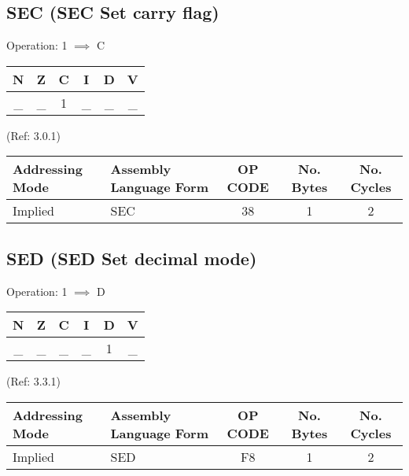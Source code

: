 \documentclass{article}
\begin{document}
  \subsection{SEC (SEC Set carry flag)}
  Operation:  1 $\implies$ C
  \begin{table}[H]
  \centering
  \begin{tabular}{|c c c c c c|}
  \hline
  N&Z&C&I&D&V\\
  \hline
  \_ & \_ & 1 & \_ & \_ & \_\\
  \hline
  \end{tabular}
  \end{table}
                                (Ref: 3.0.1)
  \begin{table}[H]
  \centering
  \begin{tabular}{|l|l|c|c|c|}
  \hline
    Addressing Mode& Assembly Language Form& OP CODE &No. Bytes&No. Cycles\\
  \hline
     Implied       &   SEC                 &    38   &    1    &    2     \\
  \hline
  \end{tabular}
  \end{table}


  \subsection{SED (SED Set decimal mode)}
  Operation:  1 $\implies$ D
  \begin{table}[H]
  \centering
  \begin{tabular}{|c c c c c c|}
  \hline
  N&Z&C&I&D&V\\
  \hline
  \_ & \_ & \_ & \_ & 1 & \_\\
  \hline
  \end{tabular}
  \end{table}
                                (Ref: 3.3.1)
  \begin{table}[H]
  \centering
  \begin{tabular}{|l|l|c|c|c|}
  \hline
    Addressing Mode& Assembly Language Form& OP CODE &No. Bytes&No. Cycles\\
  \hline
     Implied       &   SED                 &    F8   &    1    &    2     \\
  \hline
  \end{tabular}
  \end{table}
\end{document}
